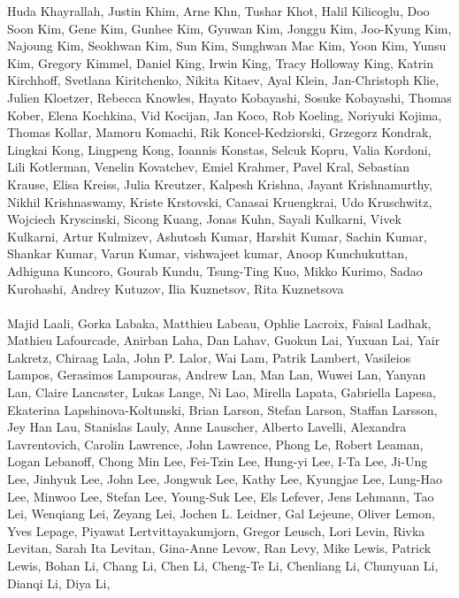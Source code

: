 \documentclass[11pt]{article}
\begin{document}
\begin{description}[itemsep=4mm, style=nextline]
Huda Khayrallah, 
Justin Khim, 
Arne Khn, 
Tushar Khot, 
Halil Kilicoglu, 
Doo Soon Kim, 
Gene Kim, 
Gunhee Kim, 
Gyuwan Kim, 
Jonggu Kim, 
Joo-Kyung Kim, 
Najoung Kim, 
Seokhwan Kim, 
Sun Kim, 
Sunghwan Mac Kim, 
Yoon Kim, 
Yunsu Kim, 
Gregory Kimmel, 
Daniel King, 
Irwin King, 
Tracy Holloway King, 
Katrin Kirchhoff, 
Svetlana Kiritchenko, 
Nikita Kitaev, 
Ayal Klein, 
Jan-Christoph Klie, 
Julien Kloetzer, 
Rebecca Knowles, 
Hayato Kobayashi, 
Sosuke Kobayashi, 
Thomas Kober, 
Elena Kochkina, 
Vid Kocijan, 
Jan Koco, 
Rob Koeling, 
Noriyuki Kojima, 
Thomas Kollar, 
Mamoru Komachi, 
Rik Koncel-Kedziorski, 
Grzegorz Kondrak, 
Lingkai Kong, 
Lingpeng Kong, 
Ioannis Konstas, 
Selcuk Kopru, 
Valia Kordoni, 
Lili Kotlerman, 
Venelin Kovatchev, 
Emiel Krahmer, 
Pavel Kral, 
Sebastian Krause, 
Elisa Kreiss, 
Julia Kreutzer, 
Kalpesh Krishna, 
Jayant Krishnamurthy, 
Nikhil Krishnaswamy, 
Kriste Krstovski, 
Canasai Kruengkrai, 
Udo Kruschwitz, 
Wojciech Kryscinski, 
Sicong Kuang, 
Jonas Kuhn, 
Sayali Kulkarni, 
Vivek Kulkarni, 
Artur Kulmizev, 
Ashutosh Kumar, 
Harshit Kumar, 
Sachin Kumar, 
Shankar Kumar, 
Varun Kumar, 
vishwajeet kumar, 
Anoop Kunchukuttan, 
Adhiguna Kuncoro, 
Gourab Kundu, 
Tsung-Ting Kuo, 
Mikko Kurimo, 
Sadao Kurohashi, 
Andrey Kutuzov, 
Ilia Kuznetsov, 
Rita Kuznetsova
\\
\\
Majid Laali, 
Gorka Labaka, 
Matthieu Labeau, 
Ophlie Lacroix, 
Faisal Ladhak, 
Mathieu Lafourcade, 
Anirban Laha, 
Dan Lahav, 
Guokun Lai, 
Yuxuan Lai, 
Yair Lakretz, 
Chiraag Lala, 
John P. Lalor, 
Wai Lam, 
Patrik Lambert, 
Vasileios Lampos, 
Gerasimos Lampouras, 
Andrew Lan, 
Man Lan, 
Wuwei Lan, 
Yanyan Lan, 
Claire Lancaster, 
Lukas Lange, 
Ni Lao, 
Mirella Lapata, 
Gabriella Lapesa, 
Ekaterina Lapshinova-Koltunski, 
Brian Larson, 
Stefan Larson, 
Staffan Larsson, 
Jey Han Lau, 
Stanislas Lauly, 
Anne Lauscher, 
Alberto Lavelli, 
Alexandra Lavrentovich, 
Carolin Lawrence, 
John Lawrence, 
Phong Le, 
Robert Leaman, 
Logan Lebanoff, 
Chong Min Lee, 
Fei-Tzin Lee, 
Hung-yi Lee, 
I-Ta Lee, 
Ji-Ung Lee, 
Jinhyuk Lee, 
John Lee, 
Jongwuk Lee, 
Kathy Lee, 
Kyungjae Lee, 
Lung-Hao Lee, 
Minwoo Lee, 
Stefan Lee, 
Young-Suk Lee, 
Els Lefever, 
Jens Lehmann, 
Tao Lei, 
Wenqiang Lei, 
Zeyang Lei, 
Jochen L. Leidner, 
Gal Lejeune, 
Oliver Lemon, 
Yves Lepage, 
Piyawat Lertvittayakumjorn, 
Gregor Leusch, 
Lori Levin, 
Rivka Levitan, 
Sarah Ita Levitan, 
Gina-Anne Levow, 
Ran Levy, 
Mike Lewis, 
Patrick Lewis, 
Bohan Li, 
Chang Li, 
Chen Li, 
Cheng-Te Li, 
Chenliang Li, 
Chunyuan Li, 
Dianqi Li, 
Diya Li, 

\end{description}
\end{document}
